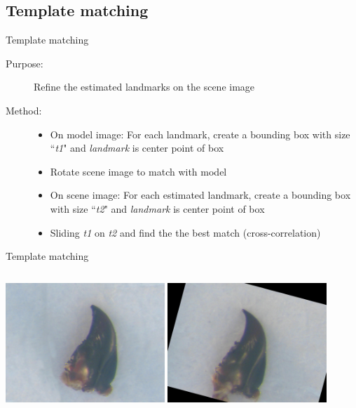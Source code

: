 \documentclass{beamer}
\begin{document}
\subsection{Template matching}
\begin{frame}{Template matching}
	\begin{description}
		\item [Purpose:] Refine the estimated landmarks on the scene image 
		\item [Method:] 
			\begin{itemize}
				\item On model image: For each landmark, create a bounding box with size ``\textit{t1}" and \textit{landmark} is center point of box
				\item Rotate scene image to match with model
				\item On scene image: For each estimated landmark, create a bounding box with size ``\textit{t2}" and \textit{landmark} is center point of box
				\item Sliding \textit{t1} on \textit{t2} and find the the best match (cross-correlation)
			\end{itemize}
	\end{description}
\end{frame}
\begin{frame}{Template matching}
	\begin{columns}[c]
		\includegraphics[height=4.5cm]{images/est28.JPG}
		\includegraphics[height=4.5cm]{images/est32.JPG}
	\end{columns}
\end{frame}
\end{document}
